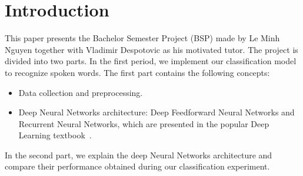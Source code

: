 
\section{Introduction}

This paper presents the Bachelor Semester Project (BSP) made by Le Minh Nguyen
together with Vladimir Despotovic as his motivated tutor. The project is divided
into two parts. In the first period, we implement our classification model to
recognize spoken words. The first part contains the following concepts:\\

\begin{itemize}
\item Data collection and preprocessing.
\item Deep Neural Networks architecture: Deep Feedforward Neural Networks and
  Recurrent Neural Networks, which are presented in the popular Deep Learning
  textbook~\cite{Goodfellow-et-al-2016}.
\end{itemize}

In the second part, we explain the deep Neural Networks architecture and compare their
performance obtained during our classification experiment.\\
